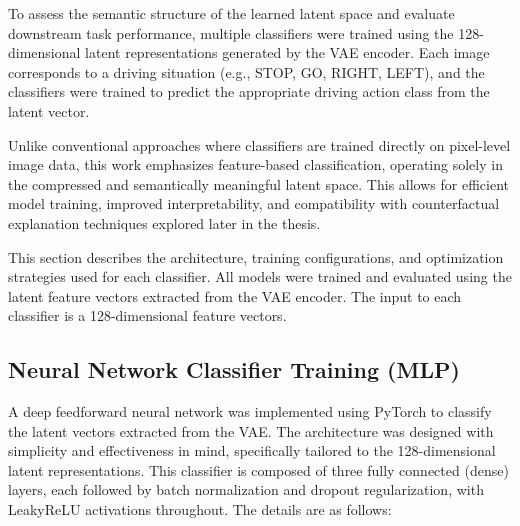 To assess the semantic structure of the learned latent space and evaluate downstream task performance, multiple classifiers were trained using the 128-dimensional latent representations generated by the VAE encoder. Each image corresponds to a driving situation (e.g., STOP, GO, RIGHT, LEFT), and the classifiers were trained to predict the appropriate driving action class from the latent vector.

Unlike conventional approaches where classifiers are trained directly on pixel-level image data, this work emphasizes feature-based classification, operating solely in the compressed and semantically meaningful latent space. This allows for efficient model training, improved interpretability, and compatibility with counterfactual explanation techniques explored later in the thesis.

This section describes the architecture, training configurations, and optimization strategies used for each classifier. All models were trained and evaluated using the latent feature vectors extracted from the VAE encoder. The input to each classifier is a 128-dimensional feature vectors.

\subsection{Neural Network Classifier Training (MLP)} \label{subsec:neural_network_classifier_training}

A deep feedforward neural network was implemented using PyTorch to classify the latent vectors extracted from the VAE. The architecture was designed with simplicity and effectiveness in mind, specifically tailored to the 128-dimensional latent representations. This classifier is composed of three fully connected (dense) layers, each followed by batch normalization and dropout regularization, with LeakyReLU activations throughout. The details are as follows:

